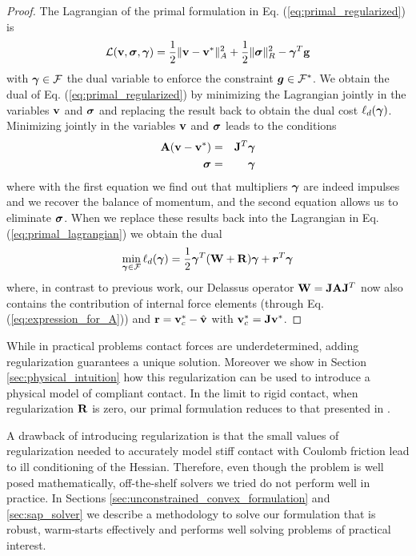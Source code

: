 \begin{proof}
The Lagrangian of the primal formulation in Eq. (\ref{eq:primal_regularized}) is
\begin{equation}
	\mathcal{L}(\mf{v},\bsigma,\vf{\gamma}) = 
	\frac{1}{2}\Vert\mf{v}-\mf{v}^*\Vert_A^2 + \frac{1}{2} \Vert\bsigma\Vert_{R}^2 - \vf{\gamma}^T\mf{g}
	\label{eq:primal_lagrangian}
\end{equation}
with ${\bm{\gamma}}\in\mathcal{F}$ the dual variable to enforce the constraint
${\bm{g}}\in \mathcal{F}^*$. We obtain the dual of Eq.
(\ref{eq:primal_regularized}) by minimizing the Lagrangian jointly in the
variables ${\mathbf{v}}$ and ${\bm\sigma}$ and replacing the result back to obtain the
dual cost $\ell_d({\bm{\gamma}})$. Minimizing jointly in the variables ${\mathbf{v}}$
and ${\bm\sigma}$ leads to the conditions
\begin{eqnarray}
	{\mathbf{A}}({\mathbf{v}}-{\mathbf{v}}^*) &=& {\mathbf{J}}^T{\bm{\gamma}}\\
	{\bm{\sigma}} &=& {\bm{\gamma}}
\end{eqnarray}
where with the first equation we find out that multipliers ${\bm\gamma}$ are indeed
impulses and we recover the balance of momentum, and the second equation allows
us to eliminate ${\bm{\sigma}}$. When we replace these results back into the
Lagrangian in Eq. (\ref{eq:primal_lagrangian}) we obtain the dual
\begin{eqnarray}
	\min_{{\bm\gamma}\in \mathcal{F}} \ell_d({\bm\gamma}) =
	\frac{1}{2}{\bm\gamma}^T(\mathbf{W}+\mathbf{R}){\bm\gamma} + {\bm r}^T
	{\bm\gamma}
\end{eqnarray}
where, in contrast to previous work, our Delassus operator
${\mathbf{W}}={\mathbf{J}}{\mathbf{A}}{\mathbf{J}}^T$ now also contains the contribution of internal
force elements (through Eq. (\ref{eq:expression_for_A})) and
${\mathbf{r}}={\mathbf{v}}_c^*-\hat{{\mathbf{v}}}$ with ${\mathbf{v}}_c^*={\mathbf{J}}{\mathbf{v}}^*$.
\end{proof}

While in practical problems contact forces are underdetermined, adding
regularization guarantees a unique solution. Moreover we show in Section
\ref{sec:physical_intuition} how this regularization can be used to introduce a
physical model of compliant contact. In the limit to rigid contact, when
regularization ${\mathbf{R}}$ is zero, our primal formulation reduces to that
presented in \cite{bib:mazhar2014}.

A drawback of introducing regularization is that the small values of
regularization needed to accurately model stiff contact with Coulomb friction
lead to ill conditioning of the Hessian. Therefore, even though the problem is
well posed mathematically, off-the-shelf solvers we tried do not perform well in
practice. In Sections \ref{sec:unconstrained_convex_formulation} and
\ref{sec:sap_solver} we describe a methodology to solve our formulation that is
robust, warm-starts effectively and performs well solving problems of practical
interest.
